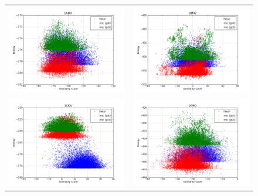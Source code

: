\documentclass[a4paper,12pt]{article}
\begin{document}
   \begin{figure}[t]
     \centering
     \begin{tabular}{cc}
       \includegraphics[width=8.45cm]{gen_08032012/1ABO/1ABO_simil_vs_ener.png} &
       \includegraphics[width=8.45cm]{gen_08032012/1BM2/1BM2_simil_vs_ener.png} \\
       \includegraphics[width=8.45cm]{gen_08032012/1CKA/1CKA_simil_vs_ener.png} &
       \includegraphics[width=8.45cm]{gen_08032012/1G9O/1G9O_simil_vs_ener.png} \\

\end{tabular}
\end{figure}
\end{document}
